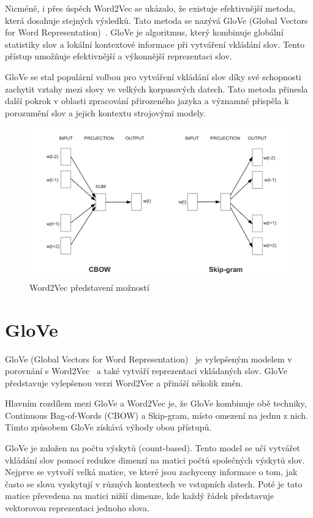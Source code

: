 Nicméně, i přes úspěch Word2Vec se ukázalo, že existuje efektivnější metoda, která dosahuje stejných výsledků. Tato metoda se nazývá GloVe (Global Vectors for Word Representation)~\cite{link18}. GloVe je algoritmus, který kombinuje globální statistiky slov a lokální kontextové informace při vytváření vkládání slov. Tento přístup umožňuje efektivnější a výkonnější reprezentaci slov.

GloVe se stal populární volbou pro vytváření vkládání slov díky své schopnosti zachytit vztahy mezi slovy ve velkých korpusových datech. Tato metoda přinesla další pokrok v oblasti zpracování přirozeného jazyka a významně přispěla k porozumění slov a jejich kontextu strojovými modely.

\begin{figure}[H]
	\centering
	\includegraphics[width=1\textwidth]{Figures/word2vec_diagrams.png}
	\caption{Word2Vec představení možností~\cite{link6}}\label{fig:Word2Vec predstaveni moznosti}
\end{figure}

\section{GloVe}
GloVe (Global Vectors for Word Representation)~\cite{link18} je vylepšeným modelem v porovnání s Word2Vec~\cite{link6} a také vytváří reprezentaci vkládaných slov.
GloVe představuje vylepšenou verzi Word2Vec a přináší několik změn.

Hlavním rozdílem mezi GloVe a Word2Vec je, že GloVe kombinuje obě techniky, Continuous Bag-of-Words (CBOW) a Skip-gram, místo omezení na jednu z nich.
Tímto způsobem GloVe získává výhody obou přístupů.

GloVe je založen na počtu výskytů (count-based).
Tento model se učí vytvářet vkládání slov pomocí redukce dimenzí na matici počtů společných výskytů slov.
Nejprve se vytvoří velká matice, ve které jsou zachyceny informace o tom, jak často se slova vyskytují v různých kontextech ve vstupních datech.
Poté je tato matice převedena na matici nižší dimenze, kde každý řádek představuje vektorovou reprezentaci jednoho slova.

